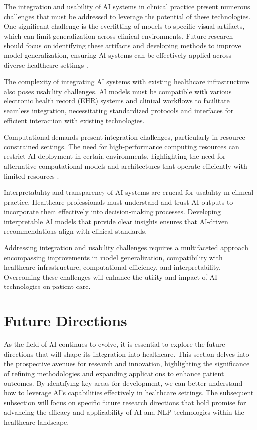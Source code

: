 The integration and usability of AI systems in clinical practice present numerous challenges that must be addressed to leverage the potential of these technologies. One significant challenge is the overfitting of models to specific visual artifacts, which can limit generalization across clinical environments. Future research should focus on identifying these artifacts and developing methods to improve model generalization, ensuring AI systems can be effectively applied across diverse healthcare settings \cite{deboer2023progressactivityprogressprediction}.

The complexity of integrating AI systems with existing healthcare infrastructure also poses usability challenges. AI models must be compatible with various electronic health record (EHR) systems and clinical workflows to facilitate seamless integration, necessitating standardized protocols and interfaces for efficient interaction with existing technologies.

Computational demands present integration challenges, particularly in resource-constrained settings. The need for high-performance computing resources can restrict AI deployment in certain environments, highlighting the need for alternative computational models and architectures that operate efficiently with limited resources \cite{ryabko2005samplecomplexitycomputationalpattern}.

Interpretability and transparency of AI systems are crucial for usability in clinical practice. Healthcare professionals must understand and trust AI outputs to incorporate them effectively into decision-making processes. Developing interpretable AI models that provide clear insights ensures that AI-driven recommendations align with clinical standards.

Addressing integration and usability challenges requires a multifaceted approach encompassing improvements in model generalization, compatibility with healthcare infrastructure, computational efficiency, and interpretability. Overcoming these challenges will enhance the utility and impact of AI technologies on patient care.





\section{Future Directions} \label{sec:Future Directions}

As the field of AI continues to evolve, it is essential to explore the future directions that will shape its integration into healthcare. This section delves into the prospective avenues for research and innovation, highlighting the significance of refining methodologies and expanding applications to enhance patient outcomes. By identifying key areas for development, we can better understand how to leverage AI's capabilities effectively in healthcare settings. The subsequent subsection will focus on specific future research directions that hold promise for advancing the efficacy and applicability of AI and NLP technologies within the healthcare landscape.





